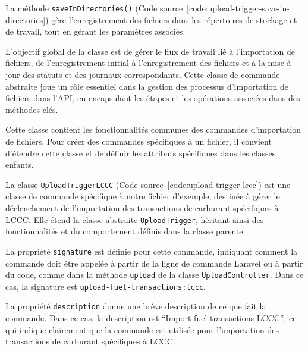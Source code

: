 
La méthode \Verb|saveInDirectories()| (Code source~\ref{code:upload-trigger-save-in-directories}) gère l'enregistrement des fichiers dans les répertoires de stockage et de travail, tout en gérant les paramètres associés.


L'objectif global de la classe est de gérer le flux de travail lié à l'importation de fichiers, de l'enregistrement initial à l'enregistrement des fichiers et à la mise à jour des statuts et des journaux correspondants. Cette classe de commande abstraite joue un rôle essentiel dans la gestion des processus d'importation de fichiers dans l'API, en encapsulant les étapes et les opérations associées dans des méthodes clés.

Cette classe contient les fonctionnalités communes des commandes d'importation de fichiers. Pour créer des commandes spécifiques à un fichier, il convient d'étendre cette classe et de définir les attributs spécifiques dans les classes enfants.

La classe \Verb|UploadTriggerLCCC| (Code source~\ref{code:upload-trigger-lccc}) est une classe de commande spécifique à notre fichier d'exemple, destinée à gérer le déclenchement de l'importation des transactions de carburant spécifiques à LCCC. Elle étend la classe abstraite \Verb|UploadTrigger|, héritant ainsi des fonctionnalités et du comportement définis dans la classe parente.

La propriété \Verb|signature| est définie pour cette commande, indiquant comment la commande doit être appelée à partir de la ligne de commande Laravel ou à partir du code, comme dans la méthode \Verb|upload| de la classe \Verb|UploadController|. Dans ce cas, la signature est \Verb|upload-fuel-transactions:lccc|.

La propriété \Verb|description| donne une brève description de ce que fait la commande. Dans ce cas, la description est \foreignquote{french}{Import fuel transactions LCCC}, ce qui indique clairement que la commande est utilisée pour l'importation des transactions de carburant spécifiques à LCCC.

